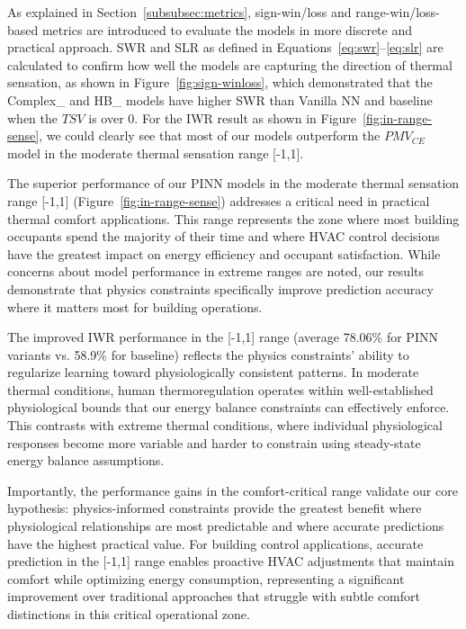 As explained in Section~\ref{subsubsec:metrics}, sign-win/loss and range-win/loss-based metrics are introduced to evaluate the models in more discrete and practical approach. SWR and SLR as defined in Equations~\eqref{eq:swr}--\eqref{eq:slr} are calculated to confirm how well the models are capturing the direction of thermal sensation, as shown in Figure~\ref{fig:sign-winloss}, which demonstrated that the Complex\_ and HB\_ models have higher SWR than Vanilla NN and baseline when the $TSV$ is over 0. For the IWR result as shown in Figure~\ref{fig:in-range-sense}, we could clearly see that most of our models outperform the $PMV_{CE}$ model in the moderate thermal sensation range [-1,1].

The superior performance of our PINN models in the moderate thermal sensation range [-1,1] (Figure~\ref{fig:in-range-sense}) addresses a critical need in practical thermal comfort applications. This range represents the zone where most building occupants spend the majority of their time and where HVAC control decisions have the greatest impact on energy efficiency and occupant satisfaction. While concerns about model performance in extreme ranges are noted, our results demonstrate that physics constraints specifically improve prediction accuracy where it matters most for building operations.

The improved IWR performance in the [-1,1] range (average 78.06\% for PINN variants vs. 58.9\% for baseline) reflects the physics constraints' ability to regularize learning toward physiologically consistent patterns. In moderate thermal conditions, human thermoregulation operates within well-established physiological bounds that our energy balance constraints can effectively enforce. This contrasts with extreme thermal conditions, where individual physiological responses become more variable and harder to constrain using steady-state energy balance assumptions.

Importantly, the performance gains in the comfort-critical range validate our core hypothesis: physics-informed constraints provide the greatest benefit where physiological relationships are most predictable and where accurate predictions have the highest practical value. For building control applications, accurate prediction in the [-1,1] range enables proactive HVAC adjustments that maintain comfort while optimizing energy consumption, representing a significant improvement over traditional approaches that struggle with subtle comfort distinctions in this critical operational zone.

